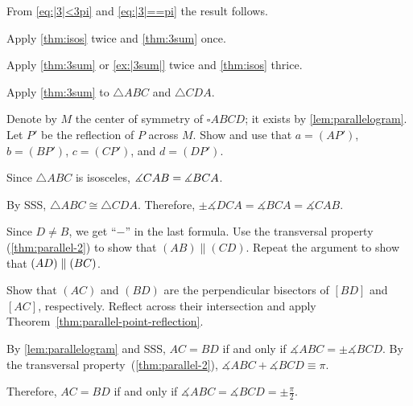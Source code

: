 From \ref{eq:|3|<3pi} and \ref{eq:|3|==pi} the result follows.

Apply \ref{thm:isos} twice and \ref{thm:3sum} once.

Apply \ref{thm:3sum} or \ref{ex:|3sum|} twice and \ref{thm:isos} thrice.





Apply \ref{thm:3sum} to $\triangle ABC$ and $\triangle CDA$.

Denote by $M$ the center of symmetry of $\square ABCD$;
it exists by \ref{lem:parallelogram}.
Let $P'$ be the reflection of $P$ across $M$.
Show and use that $a=(AP')$, $b=(BP')$, $c=(CP')$, and $d=(DP')$.

Since $\triangle ABC$ is isosceles, $\measuredangle CAB\z=\measuredangle BCA$.
 
By SSS, $\triangle ABC\cong \triangle CDA$.
Therefore, 
$\pm\measuredangle DCA= \measuredangle BCA=\measuredangle CAB$.

Since $D\ne B$, we get ``$-$'' in the last formula.
Use the transversal property (\ref{thm:parallel-2}) to show that $(AB)\parallel (CD)$.
Repeat the argument to show that $(AD)\z\parallel(BC)$.

Show that $(AC)$ and $(BD)$ are the perpendicular bisectors of $[BD]$ and $[AC]$, respectively.
Reflect across their intersection and apply Theorem~\ref{thm:parallel-point-reflection}.

By \ref{lem:parallelogram} and SSS, 
$AC=BD$
if and only if
$\measuredangle ABC=\pm \measuredangle BCD$.
By the transversal property~(\ref{thm:parallel-2}), 
$\measuredangle ABC+\measuredangle BCD\equiv \pi$.

Therefore, 
$AC=BD$
if and only if
$\measuredangle ABC
=\measuredangle BCD
=\pm\tfrac\pi2$.

